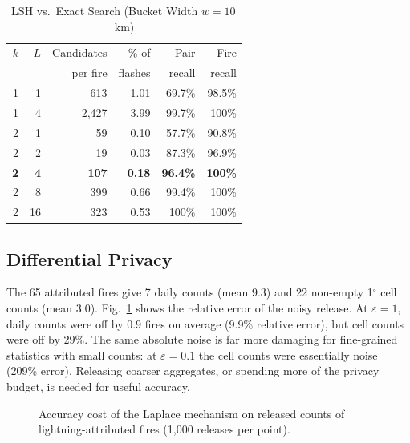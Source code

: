 \documentclass[10pt,journal,compsoc]{IEEEtran}
\begin{document}
\begin{table}[!t]
\caption{LSH vs.\ Exact Search (Bucket Width $w = 10$\,km)}
\label{tab:lsh}
\centering
\small
\setlength{\tabcolsep}{3.5pt}
\begin{tabular}{@{}rrrrrr@{}}
\toprule
$k$ & $L$ & Candidates & \% of & Pair & Fire \\
 & & per fire & flashes & recall & recall \\
\midrule
1 & 1 & 613 & 1.01 & 69.7\% & 98.5\% \\
1 & 4 & 2,427 & 3.99 & 99.7\% & 100\% \\
2 & 1 & 59 & 0.10 & 57.7\% & 90.8\% \\
2 & 2 & 19 & 0.03 & 87.3\% & 96.9\% \\
\textbf{2} & \textbf{4} & \textbf{107} & \textbf{0.18} & \textbf{96.4\%} & \textbf{100\%} \\
2 & 8 & 399 & 0.66 & 99.4\% & 100\% \\
2 & 16 & 323 & 0.53 & 100\% & 100\% \\
\bottomrule
\end{tabular}
\end{table}

\subsection{Differential Privacy}
The 65 attributed fires give 7 daily counts (mean 9.3) and 22 non-empty 1$^\circ$ cell counts (mean 3.0). Fig.~\ref{fig:dp} shows the relative error of the noisy release. At $\varepsilon = 1$, daily counts were off by 0.9 fires on average (9.9\% relative error), but cell counts were off by 29\%. The same absolute noise is far more damaging for fine-grained statistics with small counts: at $\varepsilon = 0.1$ the cell counts were essentially noise (209\% error). Releasing coarser aggregates, or spending more of the privacy budget, is needed for useful accuracy.

\begin{figure}[!t]
\centering
{}
\caption{Accuracy cost of the Laplace mechanism on released counts of lightning-attributed fires (1,000 releases per point).}
\label{fig:dp}
\end{figure}
\end{document}
